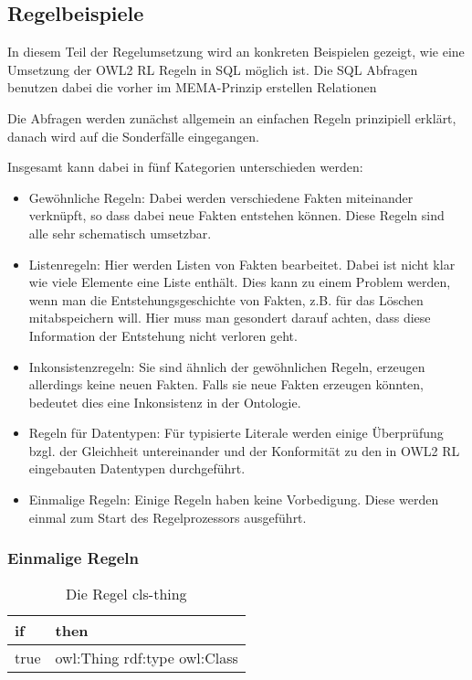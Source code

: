 \subsection{Regelbeispiele}
\label{abschnitt-regelbeispiele}
In diesem Teil der Regelumsetzung wird an konkreten Beispielen gezeigt, wie eine Umsetzung der OWL2 RL Regeln in SQL möglich ist. Die SQL Abfragen benutzen dabei die vorher im MEMA-Prinzip erstellen Relationen

Die Abfragen werden zunächst allgemein an einfachen Regeln prinzipiell erklärt, danach wird auf die Sonderfälle eingegangen.

Insgesamt kann dabei in fünf Kategorien unterschieden werden:
\begin{itemize}
  \item Gewöhnliche Regeln: Dabei werden verschiedene Fakten miteinander verknüpft, so dass dabei neue Fakten entstehen können. Diese Regeln sind alle sehr schematisch umsetzbar.
  \item Listenregeln: Hier werden Listen von Fakten bearbeitet. Dabei ist nicht klar wie viele Elemente eine Liste enthält. Dies kann zu einem Problem werden, wenn man die Entstehungsgeschichte von Fakten, z.B. für das Löschen mitabspeichern will. Hier muss man gesondert darauf achten, dass diese Information der Entstehung nicht verloren geht.
  \item Inkonsistenzregeln: Sie sind ähnlich der gewöhnlichen Regeln, erzeugen allerdings keine neuen Fakten. Falls sie neue Fakten erzeugen könnten, bedeutet dies eine Inkonsistenz in der Ontologie.
  \item Regeln für Datentypen: Für typisierte Literale werden einige Überprüfung bzgl. der Gleichheit untereinander und der Konformität zu den in OWL2 RL eingebauten Datentypen durchgeführt.
  \item Einmalige Regeln: Einige Regeln haben keine Vorbedigung. Diese werden einmal zum Start des Regelprozessors ausgeführt.
\end{itemize}

\subsubsection{Einmalige Regeln}

\begin{table}
\begin{tabular}{l|l}
if & then \\ \hline
true & owl:Thing rdf:type owl:Class
\end{tabular}
\caption{Die Regel cls-thing}
\label{rule-cls-thing}
\end{table}


